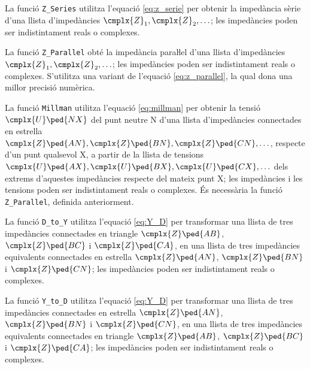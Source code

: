 La funció \texttt{Z\_Series} utilitza l'equació \eqref{eq:z_serie} per obtenir la impedància sèrie d'una llista d'impedàncies $\cmplx{Z}_1, \cmplx{Z}_2, \ldots$; les impedàncies poden ser indistintament reals o complexes.




La funció \texttt{Z\_Parallel} obté la impedància paraŀlel  d'una llista d'impedàncies $\cmplx{Z}_1, \cmplx{Z}_2, \ldots$; les impedàncies poden ser indistintament reals o complexes. S'utilitza una variant de l'equació \eqref{eq:z_parallel}, la qual dona una millor precisió numèrica.




La funció \texttt{Millman} utilitza l'equació \eqref{eq:millman} per obtenir la tensió $\cmplx{U}\ped{NX}$ del punt neutre N d'una llista d'impedàncies connectades en estrella $\cmplx{Z}\ped{AN}, \cmplx{Z}\ped{BN}, \cmplx{Z}\ped{CN}, \ldots$, respecte d'un punt qualsevol X, a partir de la llista de tensions $\cmplx{U}\ped{AX}, \cmplx{U}\ped{BX}, \cmplx{U}\ped{CX}, \ldots$ dels extrems d'aquestes impedàncies respecte del mateix punt X; les impedàncies i les tensions poden ser indistintament reals o complexes. És necessària la funció \texttt{Z\_Parallel}, definida anteriorment.




La funció \texttt{D\_to\_Y} utilitza l'equació \eqref{eq:Y_D} per transformar una llista de tres impedàncies connectades en triangle $\cmplx{Z}\ped{AB}$, $\cmplx{Z}\ped{BC}$ i  $\cmplx{Z}\ped{CA}$, en una llista de tres impedàncies equivalents connectades en estrella $\cmplx{Z}\ped{AN}$, $\cmplx{Z}\ped{BN}$ i $\cmplx{Z}\ped{CN}$; les impedàncies poden ser indistintament reals o complexes.




La funció \texttt{Y\_to\_D} utilitza l'equació \eqref{eq:Y_D} per transformar una llista de tres impedàncies connectades en estrella $\cmplx{Z}\ped{AN}$, $\cmplx{Z}\ped{BN}$ i $\cmplx{Z}\ped{CN}$, en una llista de tres impedàncies equivalents connectades en triangle $\cmplx{Z}\ped{AB}$, $\cmplx{Z}\ped{BC}$ i  $\cmplx{Z}\ped{CA}$; les impedàncies poden ser indistintament reals o complexes.

